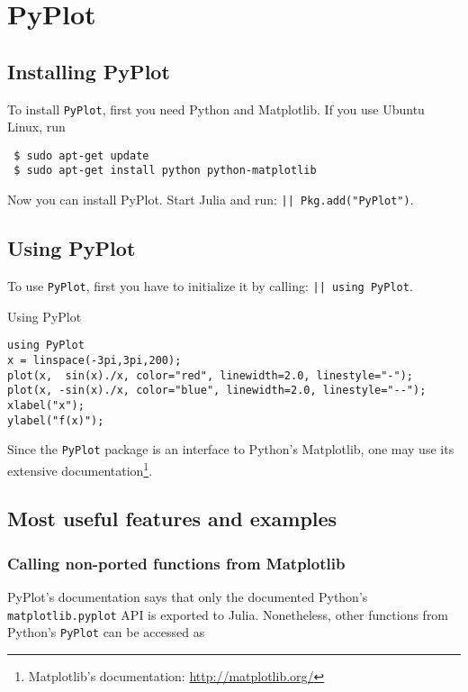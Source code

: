 \section{PyPlot}
\label{sec:PyPlot}

\subsection{Installing PyPlot}

To install \texttt{PyPlot}, first you need Python and Matplotlib. If you use Ubuntu Linux, run

\begin{verbatim}
 $ sudo apt-get update
 $ sudo apt-get install python python-matplotlib
\end{verbatim}

Now you can install PyPlot. Start Julia and run: \texttt{|\julia| Pkg.add("PyPlot")}.

\subsection{Using PyPlot}

To use \texttt{PyPlot}, first you have to initialize it by calling: \texttt{|\julia| using PyPlot}. 

\begin{example}{Using PyPlot}
\begin{verbatim}
using PyPlot
x = linspace(-3pi,3pi,200);
plot(x,  sin(x)./x, color="red", linewidth=2.0, linestyle="-");
plot(x, -sin(x)./x, color="blue", linewidth=2.0, linestyle="--");
xlabel("x");
ylabel("f(x)");
\end{verbatim}
\end{example}

Since the \texttt{PyPlot} package is an interface to Python's Matplotlib, one may use its extensive documentation\footnote{Matplotlib's documentation: \url{http://matplotlib.org/}}.


\subsection{Most useful features and examples}

\subsubsection{Calling non-ported functions from Matplotlib}

PyPlot's documentation says that only the documented Python's \texttt{matplotlib.pyplot} API is exported to Julia. Nonetheless, other functions from Python's \texttt{PyPlot} can be accessed as

